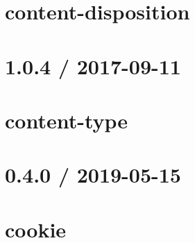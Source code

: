 \let\mypdfximage\pdfximage\def\pdfximage{\immediate\mypdfximage}\documentclass[twoside]{book}
\newcommand{\+}{\discretionary{\mbox{\scriptsize$\hookleftarrow$}}{}{}}
\begin{document}
\chapter{content-\/disposition}
\label{md__c_1__git_hub__p_r_o_y_e_c_t_o-_i_i_i-_g_o_t_rest-api-node-mysql_node_modules_content-disposition__r_e_a_d_m_e}

\chapter{1.0.4 / 2017-\/09-\/11}
\label{md__c_1__git_hub__p_r_o_y_e_c_t_o-_i_i_i-_g_o_t_rest-api-node-mysql_node_modules_content-type__h_i_s_t_o_r_y}

\chapter{content-\/type}
\label{md__c_1__git_hub__p_r_o_y_e_c_t_o-_i_i_i-_g_o_t_rest-api-node-mysql_node_modules_content-type__r_e_a_d_m_e}

\chapter{0.4.0 / 2019-\/05-\/15}
\label{md__c_1__git_hub__p_r_o_y_e_c_t_o-_i_i_i-_g_o_t_rest-api-node-mysql_node_modules_cookie__h_i_s_t_o_r_y}

\chapter{cookie}
\label{md__c_1__git_hub__p_r_o_y_e_c_t_o-_i_i_i-_g_o_t_rest-api-node-mysql_node_modules_cookie__r_e_a_d_m_e}

\end{document}
